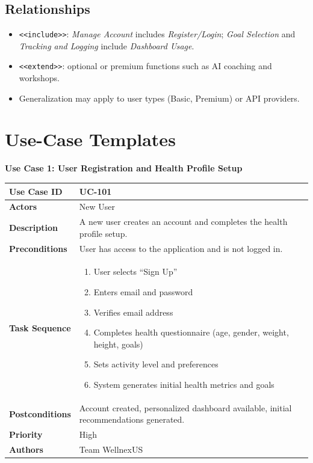 \documentclass[11pt,a4paper]{report}
\newenvironment{usecase}[1]{\par\medskip\noindent\textbf{#1}\par\smallskip\small
 \begin{tabular}{|>{\bfseries}p{2.8cm}|p{11.8cm}|}\hline}{\end{tabular}\normalsize\par}
\begin{document}
\subsection*{Relationships}
\begin{itemize}
 \item \texttt{<<include>>}: \emph{Manage Account} includes \emph{Register/Login}; \emph{Goal Selection} and \emph{Tracking and Logging} include \emph{Dashboard Usage}.
 \item \texttt{<<extend>>}: optional or premium functions such as AI coaching and workshops.
 \item Generalization may apply to user types (Basic, Premium) or API providers.
\end{itemize}

\section{Use-Case Templates}
\begin{usecase}{Use Case 1: User Registration and Health Profile Setup}
Use Case ID & UC-101\\\hline
Actors & New User\\\hline
Description & A new user creates an account and completes the health profile setup.\\\hline
Preconditions & User has access to the application and is not logged in.\\\hline
Task Sequence & \begin{enumerate}[nosep,leftmargin=*]
 \item User selects ``Sign Up''
 \item Enters email and password
 \item Verifies email address
 \item Completes health questionnaire (age, gender, weight, height, goals)
 \item Sets activity level and preferences
 \item System generates initial health metrics and goals\end{enumerate}\\\hline
Postconditions & Account created, personalized dashboard available, initial recommendations generated.\\\hline
Priority & High\\\hline Authors & Team WellnexUS\\\hline
\end{usecase}
\end{document}
